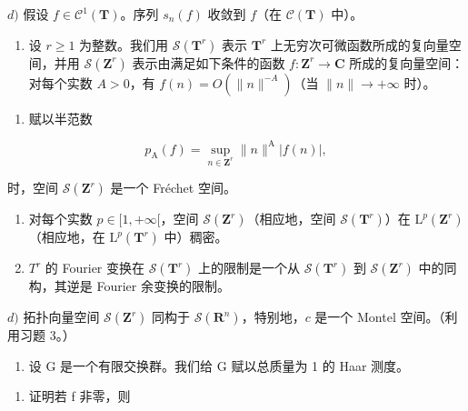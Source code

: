 \(d)\) 假设 \(f \in \mathcal{C}^1(\mathbf{T})\)。序列 \(s_n(f)\) 收敛到 \(f\)（在 \(\mathcal{C}(\mathbf{T})\) 中）。

\begin{enumerate}
\def\labelenumi{\arabic{enumi})}
\setcounter{enumi}{30}
\tightlist
\item
  设 \(r \geqslant 1\) 为整数。我们用 \(\mathcal{S}(\mathbf{T}^r)\) 表示 \(\mathbf{T}^r\) 上无穷次可微函数所成的复向量空间，并用 \(\mathcal{S}(\mathbf{Z}^r)\) 表示由满足如下条件的函数 \(f\colon \mathbf{Z}^r \to \mathbf{C}\) 所成的复向量空间：对每个实数 \(A > 0\)，有 \(f(n) = O(\|n\|^{-A})\)（当 \(\|n\| \to +\infty\) 时）。
\end{enumerate}

\begin{enumerate}
\def\labelenumi{\alph{enumi})}
\tightlist
\item
  赋以半范数
\end{enumerate}

\[
p _ {\mathrm{A}} (f) = \sup _ {n \in \mathbf {Z} ^ {r}} \| n \| ^ {\mathrm{A}} | f (n) |,
\]

时，空间 \(\mathcal{S}(\mathbf{Z}^{r})\) 是一个 Fréchet 空间。

\begin{enumerate}
\def\labelenumi{\alph{enumi})}
\setcounter{enumi}{1}
\item
  对每个实数 \(p \in [1, +\infty[\)，空间 \(\mathcal{S}(\mathbf{Z}^{r})\)（相应地，空间 \(\mathcal{S}(\mathbf{T}^{r})\)）在 \(\mathrm{L}^{p}(\mathbf{Z}^{r})\)（相应地，在 \(\mathrm{L}^{p}(\mathbf{T}^{r})\) 中）稠密。
\item
  \(T^{r}\) 的 Fourier 变换在 \(\mathcal{S}(\mathbf{T}^{r})\) 上的限制是一个从 \(\mathcal{S}(\mathbf{T}^{r})\) 到 \(\mathcal{S}(\mathbf{Z}^{r})\) 中的同构，其逆是 Fourier 余变换的限制。
\end{enumerate}

\(d)\) 拓扑向量空间 \(\mathcal{S}(\mathbf{Z}^{r})\) 同构于 \(\mathcal{S}(\mathbf{R}^{n})\)，特别地，\(c\) 是一个 Montel 空间。（利用习题 3。）

\begin{enumerate}
\def\labelenumi{\arabic{enumi})}
\setcounter{enumi}{31}
\tightlist
\item
  设 G 是一个有限交换群。我们给 G 赋以总质量为 1 的 Haar 测度。
\end{enumerate}

\begin{enumerate}
\def\labelenumi{\alph{enumi})}
\tightlist
\item
  证明若 f 非零，则
\end{enumerate}

